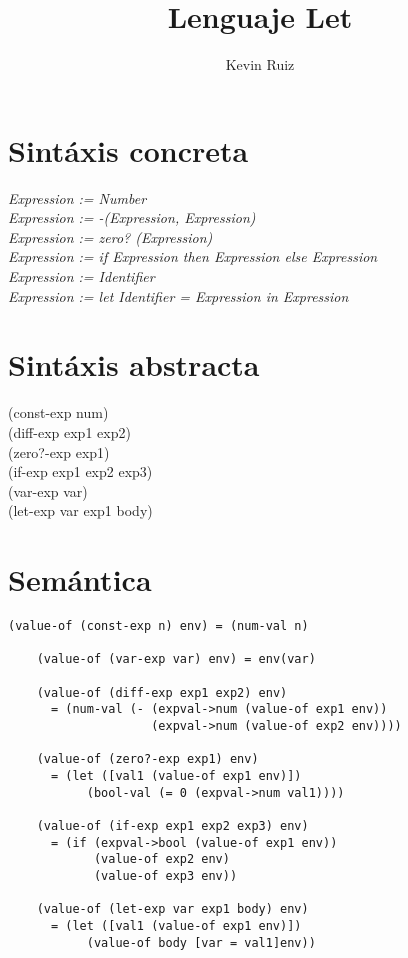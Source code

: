\documentclass{article}
\title{Lenguaje Let}
\author{Kevin Ruiz}
\date{}
\begin{document}
\maketitle

\section{Sintáxis concreta}
\emph{Expression := Number} \\
\emph{Expression := -(Expression, Expression)}\\
\emph{Expression := zero? (Expression)}\\
\emph{Expression := if Expression then Expression else Expression}\\
\emph{Expression := Identifier}\\
\emph{Expression := let Identifier = Expression in Expression} \\
\section{Sintáxis abstracta}
(const-exp num)\\
(diff-exp exp1 exp2)\\
(zero?-exp exp1)\\
(if-exp exp1 exp2 exp3)\\
(var-exp var)\\
(let-exp var exp1 body)\\

\section{Semántica}
\begin{Verbatim}
(value-of (const-exp n) env) = (num-val n)
    
    (value-of (var-exp var) env) = env(var)
    
    (value-of (diff-exp exp1 exp2) env)
      = (num-val (- (expval->num (value-of exp1 env))
                    (expval->num (value-of exp2 env))))
                    
    (value-of (zero?-exp exp1) env)
      = (let ([val1 (value-of exp1 env)])
           (bool-val (= 0 (expval->num val1))))
           
    (value-of (if-exp exp1 exp2 exp3) env)
      = (if (expval->bool (value-of exp1 env))
            (value-of exp2 env)
            (value-of exp3 env))
    
    (value-of (let-exp var exp1 body) env)
      = (let ([val1 (value-of exp1 env)])
           (value-of body [var = val1]env))
\end{Verbatim}
\end{document}
